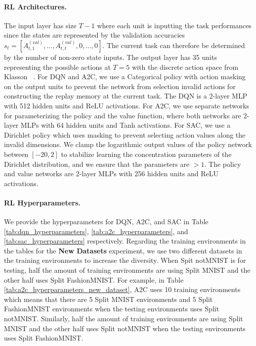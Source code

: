 \paragraph{RL Architectures.}
The input layer has size $T-1$ where each unit is inputting the task performances since the states are represented by the validation accuracies $s_t = [A_{t, 1}^{(val)}, ..., A_{t, t}^{(val)}, 0, ..., 0]$. The current task can therefore be determined by the number of non-zero state inputs. 
The output layer has 35 units representing the possible actions at $T=5$ with the discrete action space from Klasson \etal~. 
For DQN and A2C, we use a Categorical policy with action masking on the output units to prevent the network from selection invalid actions for constructing the replay memory at the current task. The DQN is a 2-layer MLP with 512 hidden units and ReLU activations. For A2C, we use separate networks for parameterizing the policy and the value function, where both networks are 2-layer MLPs with 64 hidden units and Tanh activations. 
For SAC, we use a Dirichlet policy which uses masking to prevent selecting action values along the invalid dimensions. We clamp the logarithmic output values of the policy network between $[-20, 2]$ to stabilize learning the concentration parameters of the Dirichlet distribution, and we ensure that the parameters are $>1$. The policy and value networks are 2-layer MLPs with 256 hidden units and ReLU activations. 


\vspace{-3mm}
\paragraph{RL Hyperparameters.}
We provide the hyperparameters for DQN, A2C, and SAC in Table \ref{tab:dqn_hyperparameters}, \ref{tab:a2c_hyperparameters}, and \ref{tab:sac_hyperparameters} respectively.
Regarding the training environments in the tables for the \textbf{New Datasets} experiment, we use two different datasets in the training environments to increase the diversity. When Spit notMNIST is for testing, half the amount of training environments are using Split MNIST and the other half uses Split FashionMNIST. For example, in Table \ref{tab:a2c_hyperparameters_new_dataset}, A2C uses 10 training environments which means that there are 5 Split MNIST environments and 5 Split FashionMNIST environments when the testing environments uses Split notMNIST. Similarly, half the amount of training environments are using Split MNIST and the other half uses Split notMNIST when the testing environments uses Split FashionMNIST.   

